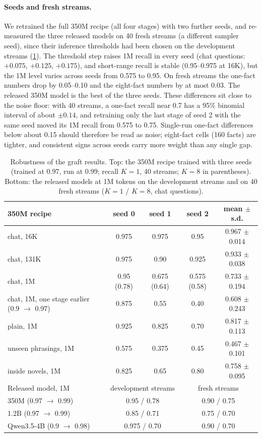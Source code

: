 \documentclass[11pt]{article}
\begin{document}
\paragraph{Seeds and fresh streams.} We retrained the full 350M recipe (all four stages) with two further seeds, and re-measured the three released models on 40 fresh streams (a different sampler seed), since their inference thresholds had been chosen on the development streams (\cref{tab:seeds}). The threshold step raises 1M recall in every seed (chat questions: $+0.075$, $+0.125$, $+0.175$), and short-range recall is stable (0.95--0.975 at 16K), but the 1M level varies across seeds from 0.575 to 0.95. On fresh streams the one-fact numbers drop by 0.05--0.10 and the eight-fact numbers by at most 0.03. The released 350M model is the best of the three seeds. These differences sit close to the noise floor: with 40 streams, a one-fact recall near 0.7 has a 95\% binomial interval of about $\pm 0.14$, and retraining only the last stage of seed 2 with the same seed moved its 1M recall from 0.575 to 0.75. Single-run one-fact differences below about 0.15 should therefore be read as noise; eight-fact cells (160 facts) are tighter, and consistent signs across seeds carry more weight than any single gap.

\begin{table}[t]
\centering
\small
\caption{Robustness of the graft results. Top: the 350M recipe trained with three seeds (trained at 0.97, run at 0.99; recall $K = 1$, 40 streams; $K = 8$ in parentheses). Bottom: the released models at 1M tokens on the development streams and on 40 fresh streams ($K = 1$ / $K = 8$, chat questions).}
\label{tab:seeds}
\begin{tabular}{@{}lcccc@{}}
\toprule
350M recipe & seed 0 & seed 1 & seed 2 & mean $\pm$ s.d. \\
\midrule
chat, 16K & 0.975 & 0.975 & 0.95 & 0.967 $\pm$ 0.014 \\
chat, 131K & 0.975 & 0.90 & 0.925 & 0.933 $\pm$ 0.038 \\
chat, 1M & 0.95 (0.78) & 0.675 (0.64) & 0.575 (0.58) & 0.733 $\pm$ 0.194 \\
chat, 1M, one stage earlier (0.9 $\to$ 0.97) & 0.875 & 0.55 & 0.40 & 0.608 $\pm$ 0.243 \\
plain, 1M & 0.925 & 0.825 & 0.70 & 0.817 $\pm$ 0.113 \\
unseen phrasings, 1M & 0.575 & 0.375 & 0.45 & 0.467 $\pm$ 0.101 \\
inside novels, 1M & 0.825 & 0.65 & 0.80 & 0.758 $\pm$ 0.095 \\
\midrule
Released model, 1M & \multicolumn{2}{c}{development streams} & \multicolumn{2}{c}{fresh streams} \\
\midrule
350M (0.97 $\to$ 0.99) & \multicolumn{2}{c}{0.95 / 0.78} & \multicolumn{2}{c}{0.90 / 0.75} \\
1.2B (0.97 $\to$ 0.99) & \multicolumn{2}{c}{0.85 / 0.71} & \multicolumn{2}{c}{0.75 / 0.70} \\
Qwen3.5-4B (0.9 $\to$ 0.98) & \multicolumn{2}{c}{0.975 / 0.70} & \multicolumn{2}{c}{0.90 / 0.70} \\
\bottomrule
\end{tabular}
\end{table}
\end{document}
